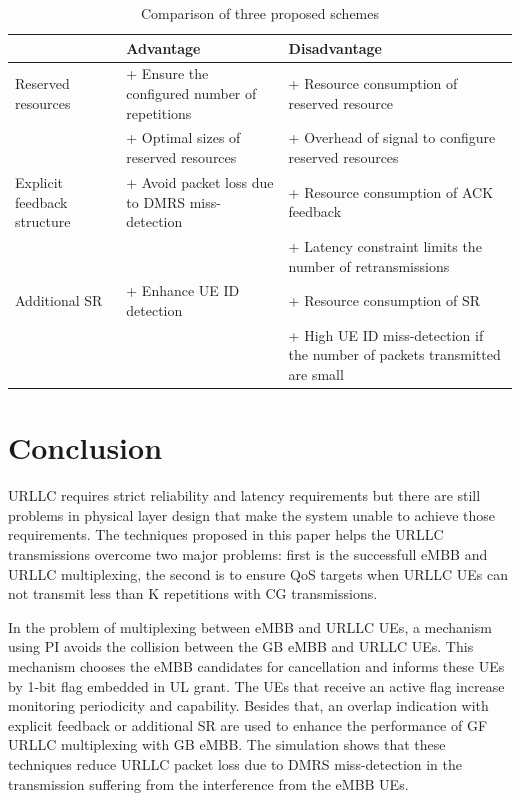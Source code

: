 \documentclass{ieeeaccess}
\begin{document}
\begin{table}[htbp]
\caption{Comparison of three proposed schemes}
\begin{center}
\begin{tabular}{|p{4em}|p{11em}|p{11em}|}
 \hline
& \textbf{Advantage}&\textbf{Disadvantage}\\
 \hline
 Reserved resources &+ Ensure the configured number of repetitions & + Resource consumption of reserved resource\\ & + Optimal sizes of reserved resources &+ Overhead of signal to configure reserved resources\\
 \hline
  Explicit feedback structure& + Avoid packet loss due to DMRS miss-detection&+ Resource consumption of ACK feedback\\& &+ Latency constraint limits the number of retransmissions\\
 \hline
Additional SR&+ Enhance UE ID detection&+ Resource consumption of SR\\& &  + High UE ID miss-detection if the number of packets transmitted are small\\

 
 \hline
\end{tabular}
\label{tab9}
\end{center}

\end{table}

\section{Conclusion}

URLLC requires strict reliability and latency requirements but there are still problems in physical layer design that make the system unable to achieve those requirements. The techniques proposed in this paper helps the URLLC transmissions overcome two major problems: first is the successfull eMBB and URLLC multiplexing, the second is to ensure QoS targets when URLLC UEs can not transmit less than K repetitions with CG transmissions. 

In the problem of multiplexing between eMBB and URLLC UEs, a mechanism using PI avoids the collision between the GB eMBB and URLLC UEs. This mechanism chooses the eMBB candidates for cancellation and informs these UEs by 1-bit flag embedded in UL grant. The UEs that receive an active flag increase monitoring periodicity and capability. Besides that, an overlap indication with explicit feedback or additional SR are used to enhance the performance of GF URLLC multiplexing with GB eMBB. The simulation shows that these techniques reduce URLLC packet loss due to DMRS miss-detection in the transmission suffering from the interference from the eMBB UEs. 
\end{document}
